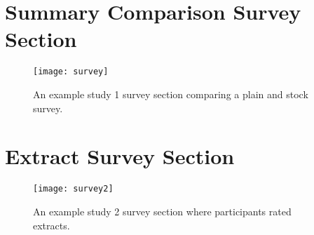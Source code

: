 \begin{appendices}
{{          
        }
      }

    \chapter{Summary Comparison Survey Section\label{app:survey-section}}
      \begin{figure}[h]
        \caption{An example study 1 survey section comparing a plain and stock survey.}
        \centering
        \texttt{[image: survey]}
      \end{figure}

    \chapter{Extract Survey Section\label{app:extract-survey-section}}
      \begin{figure}[h]
        \caption{An example study 2 survey section where participants rated extracts.}
        \centering
        \texttt{[image: survey2]}
      \end{figure}

\end{appendices}
